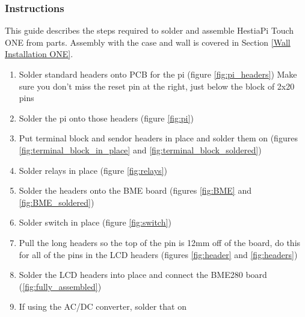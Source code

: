 \subsubsection{Instructions}
This guide describes the steps required to solder and assemble HestiaPi Touch ONE
from parts.  Assembly with the case and wall is covered in Section
\ref{Wall Installation ONE}.

\begin{enumerate}
  \item Solder standard headers onto PCB for the pi (figure \ref{fig:pi_headers})
	  Make sure you don't miss the reset pin at the right, just below the
		block of 2x20 pins
  \item Solder the pi onto those headers (figure \ref{fig:pi})
  \item Put terminal block and sendor headers in place and solder them on (figures
	  \ref{fig:terminal_block_in_place} and \ref{fig:terminal_block_soldered})
  \item Solder relays in place (figure \ref{fig:relays})
  \item Solder the headers onto the BME board (figures \ref{fig:BME} and
	  \ref{fig:BME_soldered})
  \item Solder switch in place (figure \ref{fig:switch})
  \item Pull the long headers so the top of the pin is 12mm off of the board,
	  do this for all of the pins in the LCD headers
	  (figures \ref{fig:header} and \ref{fig:headers})
  \item Solder the LCD headers into place and connect the BME280 board
	  (\ref{fig:fully_assembled})
  \item If using the AC/DC converter, solder that on
\end{enumerate}

